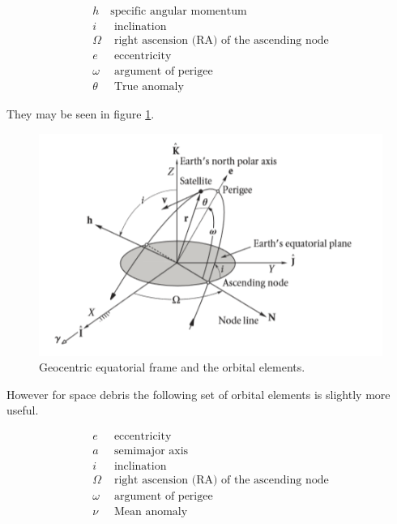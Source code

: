 \documentclass[12pt]{article}
\begin{document}
	\singlespacing
	
	\begin{eqnarray}
	h& \text{specific angular momentum}\nonumber\\
	i& \text{ inclination}\nonumber\\
	\Omega &\text{ right ascension (RA) of the ascending node}\nonumber\\
	e & \text{ eccentricity}\nonumber\\
	\omega &\text{ argument of perigee}\nonumber\\
	\theta &\text{ True anomaly}
	\end{eqnarray}
	
	They may be seen in figure \ref{fig:curtisoe}.
	
	\begin{figure}[H]
		\centering
		\includegraphics[width=0.7\linewidth]{curtis_OE}
		\caption{Geocentric equatorial frame and the orbital elements\cite{curtis2013}.}
		\label{fig:curtisoe}
	\end{figure}
	
	\doublespacing
	However for space debris the following set of orbital elements is slightly more useful. \par 
	
	\singlespacing
	
	\begin{eqnarray}
	e & \text{ eccentricity}\nonumber\\
	a & \text{ semimajor axis}\nonumber\\
	i& \text{ inclination}\nonumber\\
	\Omega &\text{ right ascension (RA) of the ascending node}\nonumber\\
	\omega &\text{ argument of perigee}\nonumber\\
	\nu &\text{ Mean anomaly}
	\end{eqnarray}
	
	\doublespacing
	
\end{document}
